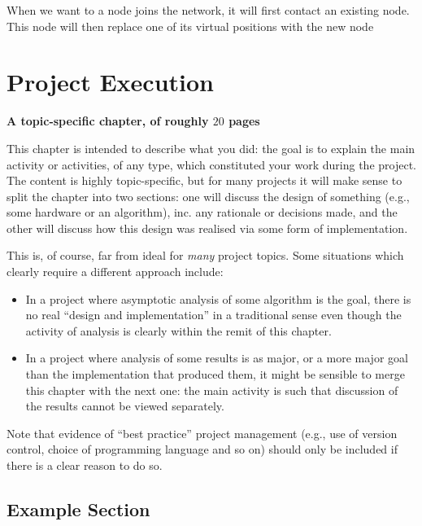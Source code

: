 \documentclass[ %
                    author={Luke Murray},
                supervisor={Dr. Simon Hollis},
                     title={Shadow Peer-to-Peer Networks},
                  subtitle={},
                    degree={MEng},
                      year={2013} ]{thesis}
\begin{document}
When we want to a node joins the network, it will first contact an existing node. This node will then replace one of its virtual positions with the new node


\chapter{Project Execution}
\label{chap:execution}

{\bf A topic-specific chapter, of roughly $20$ pages} 
\vspace{1cm} 

\noindent
This chapter is intended to describe what you did: the goal is to explain
the main activity or activities, of any type, which constituted your work 
during the project.  The content is highly topic-specific, but for many 
projects it will make sense to split the chapter into two sections: one 
will discuss the design of something (e.g., some hardware or an algorithm), 
inc. any rationale or decisions made, and the other will discuss how this 
design was realised via some form of implementation.  

This is, of course, far from ideal for {\em many} project topics.  Some
situations which clearly require a different approach include:

\begin{itemize}
\item In a project where asymptotic analysis of some algorithm is the goal,
      there is no real ``design and implementation'' in a traditional sense
      even though the activity of analysis is clearly within the remit of
      this chapter.
\item In a project where analysis of some results is as major, or a more
      major goal than the implementation that produced them, it might be
      sensible to merge this chapter with the next one: the main activity 
      is such that discussion of the results cannot be viewed separately.
\end{itemize}

\noindent
Note that evidence of ``best practice'' project management (e.g., use of 
version control, choice of programming language and  so on) should only 
be included if there is a clear reason to do so.

\section{Example Section}
\end{document}
